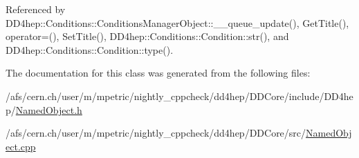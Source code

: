 Referenced by DD4hep::Conditions::ConditionsManagerObject::\_\-\_\-queue\_\-update(), GetTitle(), operator=(), SetTitle(), DD4hep::Conditions::Condition::str(), and DD4hep::Conditions::Condition::type().

The documentation for this class was generated from the following files:\begin{DoxyCompactItemize}
\item 
/afs/cern.ch/user/m/mpetric/nightly\_\-cppcheck/dd4hep/DDCore/include/DD4hep/\hyperlink{_named_object_8h}{NamedObject.h}\item 
/afs/cern.ch/user/m/mpetric/nightly\_\-cppcheck/dd4hep/DDCore/src/\hyperlink{_named_object_8cpp}{NamedObject.cpp}\end{DoxyCompactItemize}
